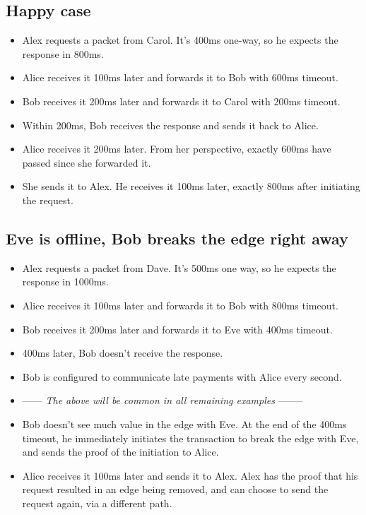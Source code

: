 \documentclass{article}
\begin{document}
\subsection{Happy case}

\begin{itemize}
    \item Alex requests a packet from Carol. It's 400ms one-way, so he expects the response in 800ms.
    \item Alice receives it 100ms later and forwards it to Bob with 600ms timeout.
    \item Bob receives it 200ms later and forwards it to Carol with 200ms timeout.
    \item Within 200ms, Bob receives the response and sends it back to Alice.
    \item Alice receives it 200ms later. From her perspective, exactly 600ms have passed since she forwarded it.
    \item She sends it to Alex. He receives it 100ms later, exactly 800ms after initiating the request.
\end{itemize}


\subsection{Eve is offline, Bob breaks the edge right away}

\begin{itemize}
    \item Alex requests a packet from Dave. It's 500ms one way, so he expects the response in 1000ms.
    \item Alice receives it 100ms later and forwards it to Bob with 800ms timeout.
    \item Bob receives it 200ms later and forwards it to Eve with 400ms timeout.
    \item 400ms later, Bob doesn't receive the response.
    \item Bob is configured to communicate late payments with Alice every second.
    \item ------ \textit{The above will be common in all remaining examples} --------
    \item Bob doesn't see much value in the edge with Eve. At the end of the 400ms timeout, he immediately initiates the transaction to break the edge with Eve, and sends the proof of the initiation to Alice.
    \item Alice receives it 100ms later and sends it to Alex. Alex has the proof that his request resulted in an edge being removed, and can choose to send the request again, via a different path.
\end{itemize}
\end{document}
